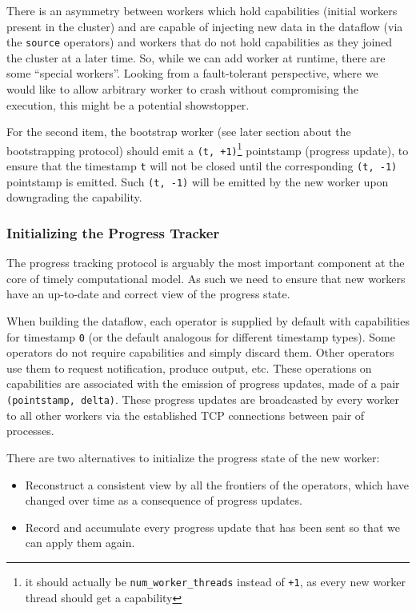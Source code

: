 \documentclass[12pt]{extarticle}
\begin{document}
There is an asymmetry between workers which hold capabilities (initial workers present in the cluster)
and are capable of injecting new data in the dataflow (via the \verb|source| operators) and workers
that do not hold capabilities as they joined the cluster at a later time. So, while we can add worker
at runtime, there are some ``special workers''.
Looking from a fault-tolerant perspective, where we would like to allow arbitrary worker to crash without
compromising the execution, this might be a potential showstopper.

\vspace{3mm}
For the second item, the bootstrap worker (see later section about the bootstrapping protocol)
should emit a \verb|(t, +1)|\footnote{it should actually be \verb|num_worker_threads| instead of \verb|+1|, as every new worker thread should get a capability}
pointstamp (progress update), to ensure that the timestamp \verb|t| will not be closed
until the corresponding \verb|(t, -1)| pointstamp is emitted.
Such \verb|(t, -1)| will be emitted by the new worker upon downgrading the capability.

\subsubsection{Initializing the Progress Tracker}
The progress tracking protocol is arguably the most important component at the core of timely computational model.
As such we need to ensure that new workers have an up-to-date and correct view of the progress state.

When building the dataflow, each operator is supplied by default with capabilities for timestamp \verb|0| (or the default analogous for different
timestamp types). Some operators do not require capabilities and simply discard them. Other operators use them to request notification,
produce output, etc.
These operations on capabilities are associated with the emission of progress updates, made of a pair \verb|(pointstamp, delta)|.
These progress updates are broadcasted by every worker to all other workers via the established TCP connections between pair of processes.

There are two alternatives to initialize the progress state of the new worker:
\begin{itemize}
    \item Reconstruct a consistent view by all the frontiers of the operators, which have changed over time as a consequence of progress updates.
    \item Record and accumulate every progress update that has been sent so that we can apply them again.
\end{itemize}
\end{document}
